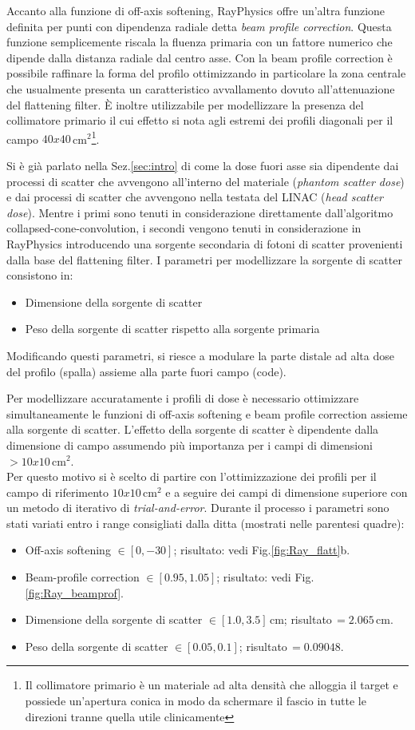 Accanto alla funzione di off-axis softening, RayPhysics offre un'altra funzione definita per punti con dipendenza radiale detta \textit{beam profile correction}. Questa funzione semplicemente riscala la fluenza primaria con un fattore numerico che dipende dalla distanza radiale dal centro asse. Con la beam profile correction è possibile raffinare la forma del profilo ottimizzando in particolare la zona centrale che usualmente presenta un caratteristico avvallamento dovuto all'attenuazione del flattening filter. \`E inoltre utilizzabile per modellizzare la presenza del collimatore primario il cui effetto si nota agli estremi dei profili diagonali per il campo $40x40\,$cm$^2$\footnote{Il collimatore primario è un materiale ad alta densità che alloggia il target e possiede un'apertura conica in modo da schermare il fascio in tutte le direzioni tranne quella utile clinicamente}.

Si è già parlato nella Sez.\ref{sec:intro} di come la dose fuori asse sia dipendente dai processi di scatter che avvengono all'interno del materiale (\textit{phantom scatter dose}) e dai processi di scatter che avvengono nella testata del LINAC (\textit{head scatter dose}). Mentre i primi sono tenuti in considerazione direttamente dall'algoritmo collapsed-cone-convolution, i secondi vengono tenuti in considerazione in RayPhysics introducendo una sorgente secondaria di fotoni di scatter provenienti dalla base del flattening filter. I parametri per modellizzare la sorgente di scatter consistono in:
\begin{itemize}
\item Dimensione della sorgente di scatter
\item Peso della sorgente di scatter rispetto alla sorgente primaria
\end{itemize}
Modificando questi parametri, si riesce a modulare la parte distale ad alta dose del profilo (spalla) assieme alla parte fuori campo (code).

Per modellizzare accuratamente i profili di dose è necessario ottimizzare simultaneamente le funzioni di off-axis softening e beam profile correction assieme alla sorgente di scatter. L'effetto della sorgente di scatter è dipendente dalla dimensione di campo assumendo più importanza per i campi di dimensioni $> 10x10\,$cm$^2$.\\
Per questo motivo si è scelto di partire con l'ottimizzazione dei profili per il campo di riferimento $10x10\,$cm$^2$ e a seguire dei campi di dimensione superiore con un metodo di iterativo di \textit{trial-and-error}. Durante il processo i parametri sono stati variati entro i range consigliati dalla ditta (mostrati nelle parentesi quadre):
\begin{itemize}
\item Off-axis softening $\in[0,-30]$; risultato: vedi Fig.\ref{fig:Ray_flatt}b.
\item Beam-profile correction $\in[0.95,1.05]$; risultato: vedi Fig.\ref{fig:Ray_beamprof}.
\item Dimensione della sorgente di scatter $\in[1.0,3.5]\,$cm; risultato$\,=2.065\,$cm.
\item Peso della sorgente di scatter $\in[0.05,0.1]$; risultato$\,=0.09048$.
\end{itemize}

